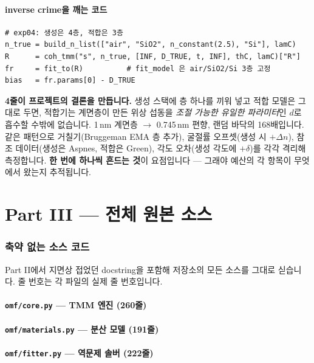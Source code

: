\documentclass[10pt,a4paper]{article}
\newcommand{\note}[1]{%
  \begin{tcolorbox}[enhanced,breakable,colback=white,colframe=accent,
    boxrule=0pt,leftrule=1.6pt,arc=0pt,outer arc=0pt,
    left=6pt,right=2pt,top=3pt,bottom=3pt,boxsep=0pt,
    before skip=5pt, after skip=8pt]
  #1
  \end{tcolorbox}}
\begin{document}
\subsection{inverse crime을 깨는 코드}
\begin{lstlisting}[firstnumber=1]
# exp04: 생성은 4층, 적합은 3층
n_true = build_n_list(["air", "SiO2", n_constant(2.5), "Si"], lamC)
R      = coh_tmm("s", n_true, [INF, D_TRUE, t, INF], thC, lamC)["R"]
fr     = fit_to(R)          # fit_model 은 air/SiO2/Si 3층 고정
bias   = fr.params[0] - D_TRUE
\end{lstlisting}
\note{
\textbf{4줄이 프로젝트의 결론을 만듭니다.} 생성 스택에 층 하나를 끼워 넣고 적합 모델은
그대로 두면, 적합기는 계면층이 만든 위상 섭동을 \emph{조절 가능한 유일한 파라미터}인
$d$로 흡수할 수밖에 없습니다. 1\,nm 계면층 $\to$ 0.745\,nm 편향, 랜덤 바닥의 168배입니다.\\[4pt]
같은 패턴으로 거칠기(Bruggeman EMA 층 추가), 굴절률 오프셋(생성 시 $+\Delta n$),
참조 데이터(생성은 Aspnes, 적합은 Green), 각도 오차(생성 각도에 $+\delta$)를 각각
격리해 측정합니다. \textbf{한 번에 하나씩 흔드는 것}이 요점입니다 — 그래야 예산의
각 항목이 무엇에서 왔는지 추적됩니다.
}

\part*{\color{accent}Part III — 전체 원본 소스}

\section{축약 없는 소스 코드}

Part II에서 지면상 접었던 docstring을 포함해 저장소의 모든 소스를 그대로 싣습니다.
줄 번호는 각 파일의 실제 줄 번호입니다.
\subsection{\texttt{omf/core.py} — TMM 엔진 (260줄)}

\subsection{\texttt{omf/materials.py} — 분산 모델 (191줄)}

\subsection{\texttt{omf/fitter.py} — 역문제 솔버 (222줄)}

\end{document}
